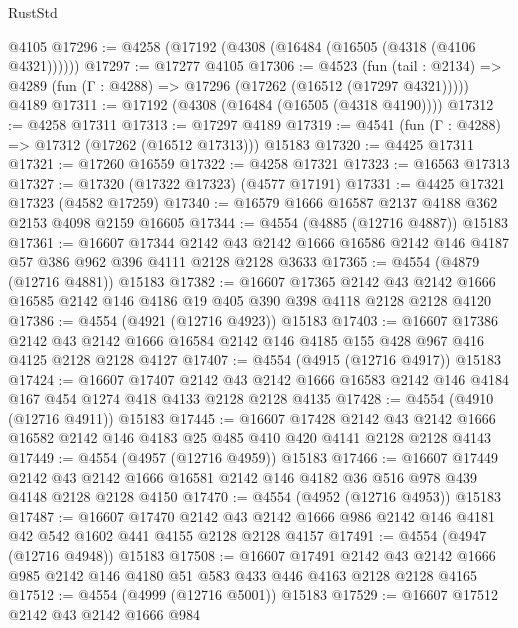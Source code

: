 \begin{lexlean}{RustStd}
\begin{coremodule}
{\begin{coremodule}
{{{{{{{{{{{{{{{{    @4105
@17296 := @4258 (@17192 (@4308 (@16484 (@16505 (@4318 (@4106 @4321))))))
@17297 := @17277 @4105
@17306 := @4523
    (fun (tail : @2134) => @4289 (fun (Γ : @4288) => @17296 (@17262 (@16512 (@17297 @4321)))))
    @4189
@17311 := @17192 (@4308 (@16484 (@16505 (@4318 @4190))))
@17312 := @4258 @17311
@17313 := @17297 @4189
@17319 := @4541 (fun (Γ : @4288) => @17312 (@17262 (@16512 @17313))) @15183
@17320 := @4425 @17311
@17321 := @17260 @16559
@17322 := @4258 @17321
@17323 := @16563 @17313
@17327 := @17320 (@17322 @17323) (@4577 @17191)
@17331 := @4425 @17321 @17323 (@4582 @17259)
@17340 := @16579 @1666 @16587 @2137 @4188 @362 @2153 @4098 @2159 @16605
@17344 := @4554 (@4885 (@12716 @4887)) @15183
@17361 := @16607
    @17344
    @2142
    @43
    @2142
    @1666
    @16586
    @2142
    @146
    @4187
    @57
    @386
    @962
    @396
    @4111
    @2128
    @2128
    @3633
@17365 := @4554 (@4879 (@12716 @4881)) @15183
@17382 := @16607
    @17365
    @2142
    @43
    @2142
    @1666
    @16585
    @2142
    @146
    @4186
    @19
    @405
    @390
    @398
    @4118
    @2128
    @2128
    @4120
@17386 := @4554 (@4921 (@12716 @4923)) @15183
@17403 := @16607
    @17386
    @2142
    @43
    @2142
    @1666
    @16584
    @2142
    @146
    @4185
    @155
    @428
    @967
    @416
    @4125
    @2128
    @2128
    @4127
@17407 := @4554 (@4915 (@12716 @4917)) @15183
@17424 := @16607
    @17407
    @2142
    @43
    @2142
    @1666
    @16583
    @2142
    @146
    @4184
    @167
    @454
    @1274
    @418
    @4133
    @2128
    @2128
    @4135
@17428 := @4554 (@4910 (@12716 @4911)) @15183
@17445 := @16607
    @17428
    @2142
    @43
    @2142
    @1666
    @16582
    @2142
    @146
    @4183
    @25
    @485
    @410
    @420
    @4141
    @2128
    @2128
    @4143
@17449 := @4554 (@4957 (@12716 @4959)) @15183
@17466 := @16607
    @17449
    @2142
    @43
    @2142
    @1666
    @16581
    @2142
    @146
    @4182
    @36
    @516
    @978
    @439
    @4148
    @2128
    @2128
    @4150
@17470 := @4554 (@4952 (@12716 @4953)) @15183
@17487 := @16607
    @17470
    @2142
    @43
    @2142
    @1666
    @986
    @2142
    @146
    @4181
    @42
    @542
    @1602
    @441
    @4155
    @2128
    @2128
    @4157
@17491 := @4554 (@4947 (@12716 @4948)) @15183
@17508 := @16607
    @17491
    @2142
    @43
    @2142
    @1666
    @985
    @2142
    @146
    @4180
    @51
    @583
    @433
    @446
    @4163
    @2128
    @2128
    @4165
@17512 := @4554 (@4999 (@12716 @5001)) @15183
@17529 := @16607
    @17512
    @2142
    @43
    @2142
    @1666
    @984
}}}}}}}}}}}}}}}}
\end{coremodule}}
\end{coremodule}
\end{lexlean}
